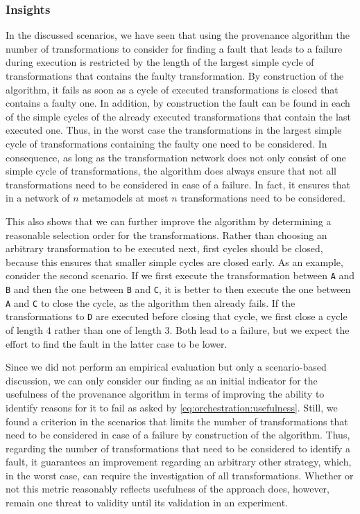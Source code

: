 \subsubsection{Insights}

In the discussed scenarios, we have seen that using the provenance algorithm the number of transformations to consider for finding a fault that leads to a failure during execution is restricted by the length of the largest simple cycle of transformations that contains the faulty transformation.
By construction of the algorithm, it fails as soon as a cycle of executed transformations is closed that contains a faulty one.
In addition, by construction the fault can be found in each of the simple cycles of the already executed transformations that contain the last executed one.
Thus, in the worst case the transformations in the largest simple cycle of transformations containing the faulty one need to be considered.
In consequence, as long as the transformation network does not only consist of one simple cycle of transformations, the algorithm does always ensure that not all transformations need to be considered in case of a failure.
In fact, it ensures that in a network of $n$ metamodels at most $n$ transformations need to be considered.

This also shows that we can further improve the algorithm by determining a reasonable selection order for the transformations.
Rather than choosing an arbitrary transformation to be executed next, first cycles should be closed, because this ensures that smaller simple cycles are closed early.
As an example, consider the second scenario.
If we first execute the transformation between \texttt{A} and \texttt{B} and then the one between \texttt{B} and \texttt{C}, it is better to then execute the one between \texttt{A} and \texttt{C} to close the cycle, as the algorithm then already fails.
If the transformations to \texttt{D} are executed before closing that cycle, we first close a cycle of length $4$ rather than one of length $3$. Both lead to a failure, but we expect the effort to find the fault in the latter case to be lower.

Since we did not perform an empirical evaluation but only a scenario-based discussion, we can only consider our finding as an initial indicator for the usefulness of the provenance algorithm in terms of improving the ability to identify reasons for it to fail as asked by \autoref{eq:orchestration:usefulness}.
Still, we found a criterion in the scenarios that limits the number of transformations that need to be considered in case of a failure by construction of the algorithm.
Thus, regarding the number of transformations that need to be considered to identify a fault, it guarantees an improvement regarding an arbitrary other strategy, which, in the worst case, can require the investigation of all transformations.
Whether or not this metric reasonably reflects usefulness of the approach does, however, remain one threat to validity until its validation in an experiment.

